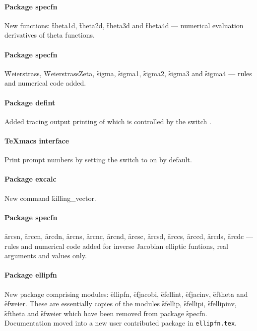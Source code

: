 \paragraph{Package specfn}

New functions: \f{theta1d}, \f{theta2d}, \f{theta3d} and \f{theta4d}
--- numerical evaluation derivatives of theta functions.

\paragraph{Package specfn}

\f{Weierstrass}, \f{WeierstrassZeta}, \f{sigma}, \f{sigma1}, \f{sigma2},
\f{sigma3} and \f{sigma4}  --- rules and numerical code added.

\paragraph{Package defint}

Added tracing output printing of which is controlled by the switch .

\paragraph{TeXmacs interface}

Print prompt numbers by setting the switch  to on by default.

\paragraph{Package excalc}

New command \f{killing\_vector}.

\paragraph{Package specfn}

\f{arcsn}, \f{arccn}, \f{arcdn}, \f{arcns}, \f{arcnc}, \f{arcnd},
\f{arcsc}, \f{arcsd}, \f{arccs}, \f{arccd}, \f{arcds}, \f{arcdc}
--- rules and numerical code added for inverse Jacobian elliptic funtions,
real arguments and values only.

\paragraph{Package ellipfn}

New package comprising modules: \f{ellipfn}, \f{efjacobi}, \f{efellint},
\f{efjacinv}, \f{eftheta} and \f{efweier}.
These are essentially copies of the modules \f{sfellip}, \f{sfellipi},
\f{sfellipinv}, \f{sftheta} and \f{sfweier} which have been removed from
package \f{specfn}.
Documentation moved into a new user contributed package in \texttt{ellipfn.tex}.

